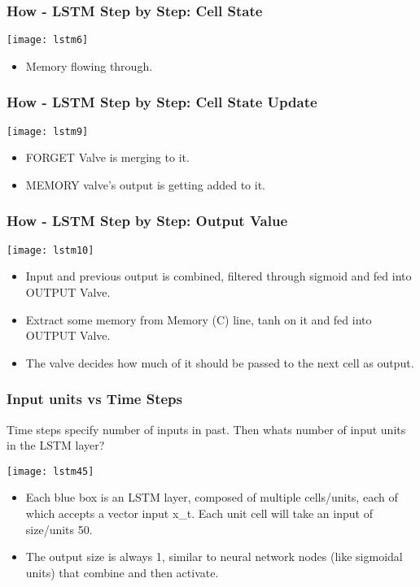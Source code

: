 \begin{frame}[fragile] \frametitle{How - LSTM Step by Step: Cell State}
\begin{center}
\texttt{[image: lstm6]}
\end{center}
\begin{itemize}
\item Memory flowing through.
\end{itemize}
\end{frame}



\begin{frame}[fragile] \frametitle{How - LSTM Step by Step: Cell State Update}
\begin{center}
\texttt{[image: lstm9]}
\end{center}
\begin{itemize}
\item FORGET Valve is merging to it. 
\item MEMORY valve's output is getting added to it.
\end{itemize}
\end{frame}


\begin{frame}[fragile] \frametitle{How - LSTM Step by Step: Output Value}
\begin{center}
\texttt{[image: lstm10]}
\end{center}
\begin{itemize}
\item Input and previous output is combined, filtered through sigmoid and fed into OUTPUT Valve.
\item Extract some memory from Memory (C) line, tanh on it and fed into OUTPUT Valve.
\item The valve decides how much of it should be passed to the next cell as output.
\end{itemize}

\end{frame}

\begin{frame}[fragile] \frametitle{Input units vs Time Steps}
Time steps specify number of inputs in past. Then whats number of input units in the LSTM layer?
\begin{center}
\texttt{[image: lstm45]}
\end{center}
\begin{itemize}
\item Each blue box is an LSTM layer, composed of multiple cells/units, each of which accepts a vector input x\_t. Each unit cell will take an input of size/units 50. 
\item The output size is always 1, similar to neural network nodes (like sigmoidal units) that combine and then activate.
\end{itemize}
\end{frame}


